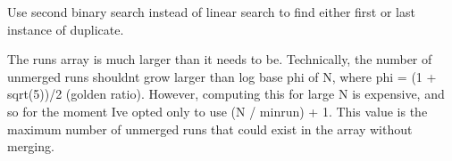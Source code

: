 
\begin{DoxyRefList}
\item[\label{todo__todo000002}%
\Hypertarget{todo__todo000002}%
Global \hyperlink{group__SortingHelper_ga347d3eac5748d59424afd8566181fc27}{bin\+\_\+search\+\_\+loc} (void $\ast$arr, size\+\_\+t size, int($\ast$compare)(const void $\ast$, const void $\ast$), size\+\_\+t lo, size\+\_\+t hi, void $\ast$target)]Use second binary search instead of linear search to find either first or last instance of duplicate. 
\item[\label{todo__todo000001}%
\Hypertarget{todo__todo000001}%
Global \hyperlink{group__Timsort_ga1c9fca70060e37617156b89b387aa4d3}{timsort} (void $\ast$arr, size\+\_\+t nelems, size\+\_\+t size, int($\ast$compare)(const void $\ast$, const void $\ast$))]The runs array is much larger than it needs to be. Technically, the number of unmerged runs shouldn\textquotesingle{}t grow larger than log base phi of N, where phi = (1 + sqrt(5))/2 (golden ratio). However, computing this for large N is expensive, and so for the moment I\textquotesingle{}ve opted only to use (N / minrun) + 1. This value is the maximum number of unmerged runs that could exist in the array without merging. 
\end{DoxyRefList}